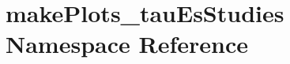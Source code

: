 \hypertarget{namespacemakePlots__tauEsStudies}{
\section{makePlots\_\-tauEsStudies Namespace Reference}
\label{namespacemakePlots__tauEsStudies}
}
